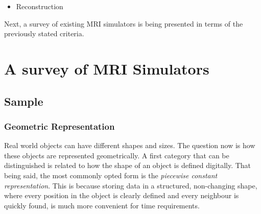 \begin{itemize}
\begin{enumerate}
    
\end{enumerate}

    

\item{Reconstruction}

\end{itemize}

Next, a survey of existing MRI simulators is being presented in terms of the previously stated criteria.

\section{A survey of MRI Simulators}

\subsection{Sample}
\subsubsection{Geometric Representation}

Real world objects can have different shapes and sizes. The question now is how these objects are represented geometrically. A first category that can be distinguished is related to how the shape of an object is defined digitally. That being said, the most commonly opted form is the \textit{piecewise constant representation}. This is because storing data in a structured, non-changing shape, where every position in the object is clearly defined and every neighbour is quickly found, is much more convenient for time requirements. 


